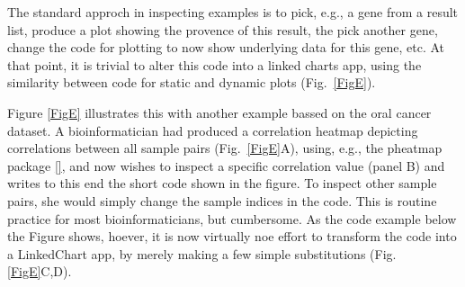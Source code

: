 \documentclass[twocolumn,10pt]{article}
\begin{document}
The standard approch in inspecting examples is to pick, e.g., a gene from a result list, produce a plot showing the provence of this result, the pick another gene, change the code for plotting to now show underlying data for this gene, etc. At that point, it is trivial to alter this code into a linked charts app, using the similarity between code for static and dynamic plots (Fig.\ \ref{FigE}).

Figure \ref{FigE} illustrates this with another example bassed on the oral cancer dataset. A bioinformatician had produced a correlation heatmap depicting correlations between all sample pairs (Fig.\ \ref{FigE}A), using, e.g., the pheatmap package \ref{}, and now wishes to inspect a specific correlation value (panel B) and writes to this end the short code shown in the figure. To inspect other sample pairs, she would simply change the sample indices in the code. This is routine practice for most bioinformaticians, but cumbersome. As the code example below the Figure shows, hoever, it is now virtually noe effort to transform the code into a LinkedChart app, by merely making a few simple substitutions (Fig. \ref{FigE}C,D).
\end{document}
